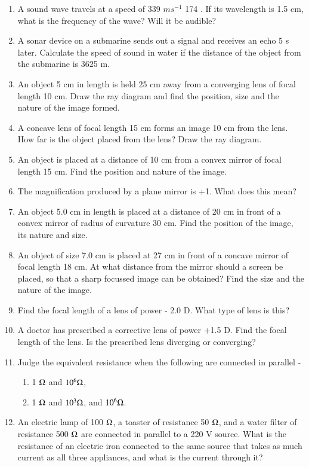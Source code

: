 \begin{enumerate}[label=\arabic*.,ref=\thesubsection.\theenumi]
\item  A sound wave travels at a speed of 339 $m s^{-1}$ 174 . If its
wavelength is 1.5 cm, what is the frequency of the wave? Will it be audible?
\item A sonar device on a submarine sends out a signal and receives an echo 5 s later. Calculate the speed of sound in water if the distance of the object from the submarine is 3625 m.
\item An object 5 cm in length is held 25 cm away from a converging lens of focal length 10 cm. Draw the ray diagram and find the position, size and the nature of the image formed.
\item  A concave lens of focal length 15 cm forms an image 10 cm from the lens. How far is the object placed from the lens? Draw the ray diagram.
\item  An object is placed at a distance of 10 cm from a convex mirror of focal length 15 cm. Find the position and nature of the image.
\item  The magnification produced by a plane mirror is +1. What does this mean? 
\item  An object 5.0 cm in length is placed at a distance of 20 cm in front of a convex mirror of radius of curvature 30 cm. Find the position of the image, its nature and size.
\item  An object of size 7.0 cm is placed at 27 cm in front of a concave mirror of focal length 18 cm. At what distance from the mirror should a screen be placed, so that a sharp focussed image can be obtained? Find the size and the nature of the image.
\item  Find the focal length of a lens of power - 2.0 D. What type of lens is this? 
\item  A doctor has prescribed a corrective lens of power +1.5 D. Find the focal length of the lens. Is the prescribed lens diverging or converging?
\item  Judge the equivalent resistance when the following are connected in parallel - 
\begin{enumerate} \item 1 $\ohm $ and $10^6 \ohm $, \item1 $\ohm $ and $10^3 \ohm$, and $10^6 \ohm$.\end{enumerate}
\item An electric lamp of 100 $\ohm$, a toaster of resistance 50 $\ohm$, and a water filter of resistance 500 $\ohm $ are connected in parallel to a 220 V source. What is the resistance of an electric iron connected to the same source that takes as much current as all three appliances, and what is the current through it?

\end{enumerate}
